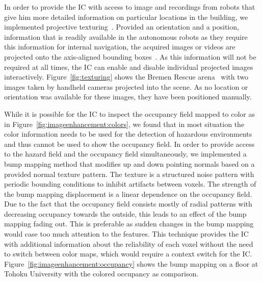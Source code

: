 \documentclass{egpubl}
\begin{document}
 In order to provide the IC with access to image and recordings from robots that give him more detailed information on particular locations in the building, we implemented projective texturing~\cite{everitt2001projective}. Provided an orientation and a position, information that is readily available in the autonomous robots as they require this information for internal navigation, the acquired images or videos are projected onto the axis-aligned bounding boxes~\cite{1453517}. As this information will not be required at all times, the IC can enable and disable individual projected images interactively. Figure~\ref{fig:texturing} shows the Bremen Rescue arena~\cite{varsadan08} with two images taken by handheld cameras projected into the scene. As no location or orientation was available for these images, they have been positioned manually.

  While it is possible for the IC to inspect the occupancy field mapped to color as in Figure~\ref{fig:imageenhancement:colors}, we found that in most situation the color information needs to be used for the detection of hazardous environments and thus cannot be used to show the occupancy field. In order to provide access to the hazard field and the occupancy field simultaneously, we implemented a bump mapping method that modifies up and down pointing normals based on a provided normal texture pattern. The texture is a structured noise pattern with periodic bounding conditions to inhibit artifacts between voxels. The strength of the bump mapping displacement is a linear dependence on the occupancy field. Due to the fact that the occupancy field consists mostly of radial patterns with decreasing occupancy towards the outside, this leads to an effect of the bump mapping fading out. This is preferable as sudden changes in the bump mapping would case too much attention to the features. This technique provides the IC with additional information about the reliability of each voxel without the need to switch between color maps, which would require a context switch for the IC. Figure~\ref{fig:imageenhancement:occupancy} shows the bump mapping on a floor at Tohoku University with the colored occupancy as comparison.

\end{document}
